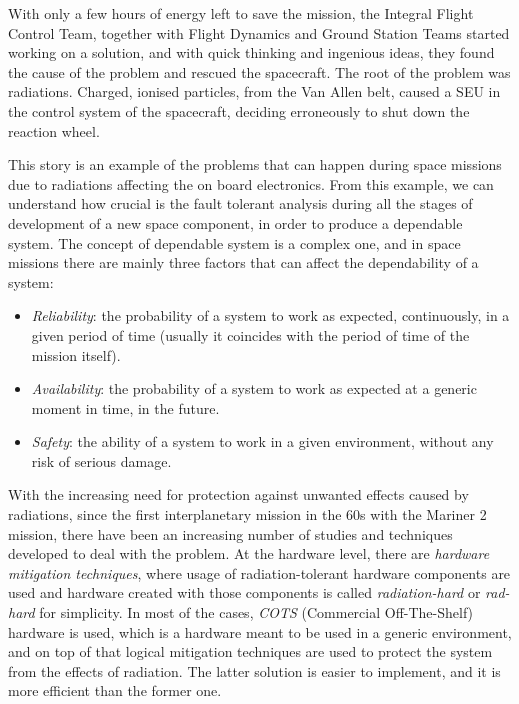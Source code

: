 With only a few hours of energy left to save the mission, the Integral Flight Control Team, together with Flight Dynamics and Ground Station Teams started working on a solution, and with quick thinking and ingenious ideas, they found the cause of the problem and rescued the spacecraft. The root of the problem was radiations. Charged, ionised particles, from the Van Allen belt, caused a SEU in the control system of the spacecraft, deciding erroneously to shut down the reaction wheel. \bigskip

This story is an example of the problems that can happen during space missions due to radiations affecting the on board electronics. From this example, we can understand how crucial is the fault tolerant analysis during all the stages of development of a new space component, in order to produce a dependable system. The concept of dependable system is a complex one, and in space missions there are mainly three factors that can affect the dependability of a system:

\begin{itemize}
    \item \textit{Reliability}: the probability of a system to work as expected, continuously, in a given period of time (usually it coincides with the period of time of the mission itself).
    \item \textit{Availability}: the probability of a system to work as expected at a generic moment in time, in the future.
    \item \textit{Safety}: the ability of a system to work in a given environment, without any risk of serious damage.
\end{itemize}

With the increasing need for protection against unwanted effects caused by radiations, since the first interplanetary mission in the 60s with the Mariner 2 mission, there have been an increasing number of studies and techniques developed to deal with the problem. At the hardware level, there are \textit{hardware mitigation techniques}, where usage of radiation-tolerant hardware components are used and hardware created with those components is called \textit{radiation-hard} or \textit{rad-hard} for simplicity. In most of the cases, \textit{COTS} (Commercial Off-The-Shelf) hardware \cite{1589186} is used, which is a hardware meant to be used in a generic environment, and on top of that logical mitigation techniques \cite{1546456} are used to protect the system from the effects of radiation. The latter solution is easier to implement, and it is more efficient than the former one.

